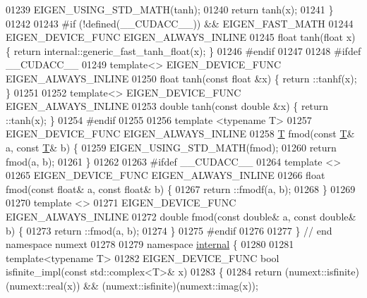 \begin{DoxyCode}
01239   EIGEN\_USING\_STD\_MATH(tanh);
01240   \textcolor{keywordflow}{return} tanh(x);
01241 \}
01242 
01243 \textcolor{preprocessor}{#if (!defined(\_\_CUDACC\_\_)) && EIGEN\_FAST\_MATH}
01244 EIGEN\_DEVICE\_FUNC EIGEN\_ALWAYS\_INLINE
01245 \textcolor{keywordtype}{float} tanh(\textcolor{keywordtype}{float} x) \{ \textcolor{keywordflow}{return} internal::generic\_fast\_tanh\_float(x); \}
01246 \textcolor{preprocessor}{#endif}
01247 
01248 \textcolor{preprocessor}{#ifdef \_\_CUDACC\_\_}
01249 \textcolor{keyword}{template}<> EIGEN\_DEVICE\_FUNC EIGEN\_ALWAYS\_INLINE
01250 \textcolor{keywordtype}{float} tanh(\textcolor{keyword}{const} \textcolor{keywordtype}{float} &x) \{ return ::tanhf(x); \}
01251 
01252 \textcolor{keyword}{template}<> EIGEN\_DEVICE\_FUNC EIGEN\_ALWAYS\_INLINE
01253 \textcolor{keywordtype}{double} tanh(\textcolor{keyword}{const} \textcolor{keywordtype}{double} &x) \{ return ::tanh(x); \}
01254 \textcolor{preprocessor}{#endif}
01255 
01256 \textcolor{keyword}{template} <\textcolor{keyword}{typename} T>
01257 EIGEN\_DEVICE\_FUNC EIGEN\_ALWAYS\_INLINE
01258 \hyperlink{group___sparse_core___module_class_eigen_1_1_triplet}{T} fmod(\textcolor{keyword}{const} \hyperlink{group___sparse_core___module_class_eigen_1_1_triplet}{T}& a, \textcolor{keyword}{const} \hyperlink{group___sparse_core___module_class_eigen_1_1_triplet}{T}& b) \{
01259   EIGEN\_USING\_STD\_MATH(fmod);
01260   \textcolor{keywordflow}{return} fmod(a, b);
01261 \}
01262 
01263 \textcolor{preprocessor}{#ifdef \_\_CUDACC\_\_}
01264 \textcolor{keyword}{template} <>
01265 EIGEN\_DEVICE\_FUNC EIGEN\_ALWAYS\_INLINE
01266 \textcolor{keywordtype}{float} fmod(\textcolor{keyword}{const} \textcolor{keywordtype}{float}& a, \textcolor{keyword}{const} \textcolor{keywordtype}{float}& b) \{
01267   return ::fmodf(a, b);
01268 \}
01269 
01270 \textcolor{keyword}{template} <>
01271 EIGEN\_DEVICE\_FUNC EIGEN\_ALWAYS\_INLINE
01272 \textcolor{keywordtype}{double} fmod(\textcolor{keyword}{const} \textcolor{keywordtype}{double}& a, \textcolor{keyword}{const} \textcolor{keywordtype}{double}& b) \{
01273   return ::fmod(a, b);
01274 \}
01275 \textcolor{preprocessor}{#endif}
01276 
01277 \} \textcolor{comment}{// end namespace numext}
01278 
01279 \textcolor{keyword}{namespace }\hyperlink{namespaceinternal}{internal} \{
01280 
01281 \textcolor{keyword}{template}<\textcolor{keyword}{typename} T>
01282 EIGEN\_DEVICE\_FUNC \textcolor{keywordtype}{bool} isfinite\_impl(\textcolor{keyword}{const} std::complex<T>& x)
01283 \{
01284   \textcolor{keywordflow}{return} (numext::isfinite)(numext::real(x)) && (numext::isfinite)(numext::imag(x));

\end{DoxyCode}
